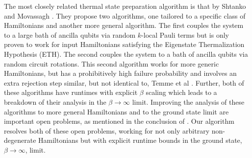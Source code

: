 \documentclass[11pt]{article}
\begin{document}
The most closely related thermal state preparation algorithm is that by Shtanko and Movassagh \cite{shtanko2023preparingthermalstatesnoiseless}. They propose two algorithms, one tailored to a specific class of Hamiltonians and another more general algorithm. The first couples the system to a large bath of ancilla qubits via random $k$-local Pauli terms but is only proven to work for input Hamiltonians satisfying the Eigenstate Thermalization Hypothesis (ETH). The second couples the system to a bath of ancilla qubits via random circuit rotations. This second algorithm works for more generic Hamiltonians, but has a prohibitively high failure probability and involves an extra rejection step similar, but not identical to, Temme et al \cite{temme2011}. Further, both of these algorithms have runtimes with explicit $\beta$ scaling which leads to a breakdown of their analysis in the $\beta \to \infty$ limit. Improving the analysis of these algorithms to more general Hamiltonians and to the ground state limit are important open problems, as mentioned in the conclusion of \cite{shtanko2023preparingthermalstatesnoiseless}. Our algorithm resolves both of these open problems, working for not only arbitrary non-degenerate Hamiltonians but with explicit runtime bounds in the ground state, $\beta \to \infty$, limit. 




\end{document}
